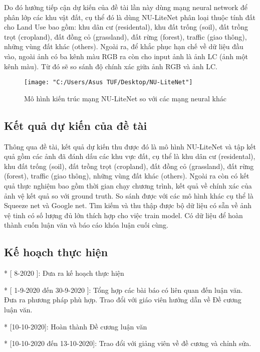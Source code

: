 \documentclass{article}[14pt]
\begin{document}
{		Do đó hướng tiếp cận dự kiến của đề tài lần này dùng mạng neural network để phân lớp các khu vật đất, cụ thể đó là dùng NU-LiteNet phân loại thuộc tính đất cho Land Use bao gồm: khu dân cư (residental), khu đất trống (soil), đất trồng trọt (cropland), đất đồng cỏ (grassland), đất rừng (forest), traffic (giao thông), những vùng đất khác (others). Ngoài ra, để khắc phục hạn chế về dữ liệu đầu vào, ngoài ảnh có ba kênh màu RGB ra còn cho input ảnh là ảnh LC (ảnh một kênh màu). Từ đó sẽ so sánh độ chính xác giữa ảnh RGB và ảnh LC. 
		
		
		
		\begin{figure}[h]
			\centering
			\texttt{[image: "C:/Users/Asus TUF/Desktop/NU-LiteNet"]}
			\caption{Mô hình kiến trúc mạng NU-LiteNet so với các mạng neural khác}
			\label{fig:nu-litenet}
		\end{figure}
		
		
		\subsection{Kết quả dự kiến của đề tài}
		
		Thông qua đề tài, kết quả dự kiến thu được đó là mô hình NU-LiteNet và tập kết quả gồm các ảnh đã đánh dấu các khu vực đất, cụ thể là khu dân cư (residental), khu đất trống (soil), đất trồng trọt (cropland), đất đồng cỏ (grassland), đất rừng (forest), traffic (giao thông), những vùng đất khác (others). Ngoài ra còn có kết quả thực nghiệm bao gồm thời gian chạy chương trình, kết quả về chính xác của ảnh vệ kết quả so với ground truth. So sánh được với các mô hình khác cụ thể là Squeeze net và Google net. Tìm kiếm và thu thập được bộ dữ liệu có sẵn về ảnh vệ tinh có số lượng đủ lớn thích hợp cho việc train model. Có dữ liệu để  hoàn thành cuốn luận văn và báo cáo khóa luận cuối cùng. 
		
		\subsection{Kế hoạch thực hiện}
		* [ 8-2020 ]: Đưa ra kế hoạch thực hiện
		
		* [ 1-9-2020 đến 30-9-2020 ]: Tổng hợp các bài báo có liên quan đến luận văn. Đưa ra phương pháp phù hợp. Trao đổi với giáo viên hướng dẫn về Đề cương luận văn.
		
		* [10-10-2020]: Hoàn thành Đề cương luận văn
		
		* [10-10-2020 đến 13-10-2020]: Trao đổi với giảng viên về đề cương và chỉnh sửa.
		
}
\end{document}
